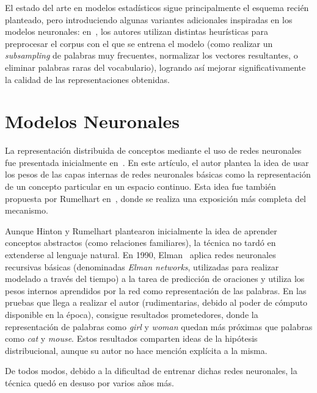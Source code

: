 El estado del arte en modelos estadísticos sigue principalmente el esquema recién planteado, pero
introduciendo algunas variantes adicionales inspiradas en los modelos neuronales:
en~\cite{Levy2015}, los autores utilizan distintas heurísticas para preprocesar el corpus con el que
se entrena el modelo (como realizar un \textit{subsampling} de palabras muy frecuentes, normalizar
los vectores resultantes, o eliminar palabras raras del vocabulario), logrando así mejorar
significativamente la calidad de las representaciones obtenidas.


\section{Modelos Neuronales}

La representación distribuida de conceptos mediante el uso de redes neuronales fue presentada
inicialmente en~\cite{Hinton1986}. En este artículo, el autor plantea la idea de usar los pesos de
las capas internas de redes neuronales básicas como la representación de un concepto particular en
un espacio continuo. Esta idea fue también propuesta por Rumelhart en~\cite{Rumelhart1986}, donde se
realiza una exposición más completa del mecanismo.

Aunque Hinton y Rumelhart plantearon inicialmente la idea de aprender conceptos abstractos (como
relaciones familiares), la técnica no tardó en extenderse al lenguaje natural. En 1990,
Elman~\cite{Elman1990} aplica redes neuronales recursivas básicas (denominadas \textit{Elman
networks}, utilizadas para realizar modelado a través del tiempo) a la tarea de predicción de
oraciones y utiliza los pesos internos aprendidos por la red como representación de las palabras. En
las pruebas que llega a realizar el autor (rudimentarias, debido al poder de cómputo disponible en
la época), consigue resultados prometedores, donde la representación de palabras como \textit{girl}
y \textit{woman} quedan más próximas que palabras como \textit{cat} y \textit{mouse}. Estos
resultados comparten ideas de la hipótesis distribucional, aunque su autor no hace mención explícita
a la misma.

De todos modos, debido a la dificultad de entrenar dichas redes neuronales, la técnica quedó en
desuso por varios años más.

